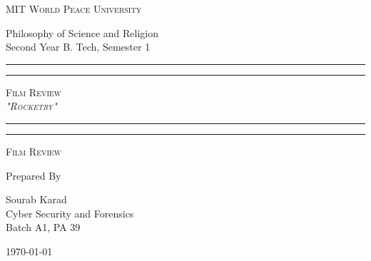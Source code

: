 \documentclass[11pt]{article}
\begin{document}
\begin{titlepage}
	\centering


	\huge\textsc{
		MIT World Peace University
	}\\

	\vspace{0.75\baselineskip} %

	\LARGE{
		Philosophy of Science and Religion\\
		Second Year B. Tech, Semester 1
	}

	\vfill %


	\rule{\textwidth}{1.6pt}\vspace*{-\baselineskip}\vspace*{2pt}
	\rule{\textwidth}{0.6pt}
	\vspace{0.75\baselineskip} %



	\huge{\textsc{
			Film Review\\
			\textit{"Rocketry"}
		}} \\



	\vspace{0.5\baselineskip} %
	\rule{\textwidth}{0.6pt}\vspace*{-\baselineskip}\vspace*{2.8pt}
	\rule{\textwidth}{1.6pt}

	\vspace{1\baselineskip} %


	\LARGE\textsc{
		Film Review
	} %
	\vfill


	Prepared By
	\vspace{0.5\baselineskip} %

	\Large{
		Sourab Karad \\
		Cyber Security and Forensics\\
		Batch A1, PA 39
	}


	\vspace{0.5\baselineskip} %
	\today

\end{titlepage}
\end{document}
